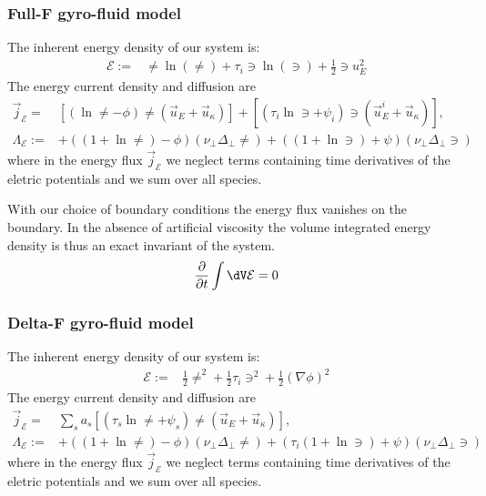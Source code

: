 \subsubsection{ Full-F gyro-fluid model}
The inherent energy density of our system is:
\begin{align}
 \mathcal{E} := &
 \ne \ln{(\ne)} + \tau_i \ni\ln{(\ni)}  + \frac{1}{2} \ni u_E^2
\end{align}
The energy current density and diffusion are
\begin{align}
  \vec j_{\mathcal E} =& \left[
  \left( \ln \ne - \phi \right)\ne\left(
  \vec u_E + \vec u_\kappa \right) \right]
  +\left[
      \left(\tau_i \ln \ni + \psi_{i} \right)\ni\left(
  \vec u_E^i + \vec u_\kappa \right) \right]
  , \\
    \Lambda_\mathcal{E} :=  &+ \left( ( 1+\ln \ne) - \phi\right)(\nu_\perp \Delta_\perp \ne)+ \left( ( 1+\ln \ni) + \psi\right)(\nu_\perp \Delta_\perp \ni)
    \label{eq:energy_diffusion}
\end{align}
where in the energy flux $\vec j_{\mathcal E}$
we neglect terms  containing time derivatives
of the eletric potentials and we sum over all species.

With our choice of boundary conditions the energy flux
vanishes on the boundary.
In the absence of artificial viscosity the volume integrated
 energy density is thus an exact invariant of the system.
\begin{align}
    \frac{\partial}{\partial t} \int \dV \mathcal E = 0
\end{align}
\subsubsection{ Delta-F gyro-fluid model}
The inherent energy density of our system is:
\begin{align}
 \mathcal{E} := &
 \frac{1}{2}\ne^2  + \frac{1}{2}\tau_i \ni^2 + \frac{1}{2} (\nabla\phi)^2
\end{align}
The energy current density and diffusion are
\begin{align}
  \vec j_{\mathcal E} =& \sum_s a_s\left[
  \left(\tau_s \ln \ne + \psi_s \right)\ne\left(
  \vec u_E + \vec u_\kappa \right) \right]
  , \\
    \Lambda_\mathcal{E} :=  &+ \left( ( 1+\ln \ne) - \phi\right)(\nu_\perp \Delta_\perp \ne)
    + \left( \tau_i( 1+\ln \ni) + \psi\right)(\nu_\perp \Delta_\perp \ni)
    \label{eq:energy_diffusion}
\end{align}
where in the energy flux $\vec j_{\mathcal E}$
we neglect terms  containing time derivatives
of the eletric potentials and we sum over all species.

